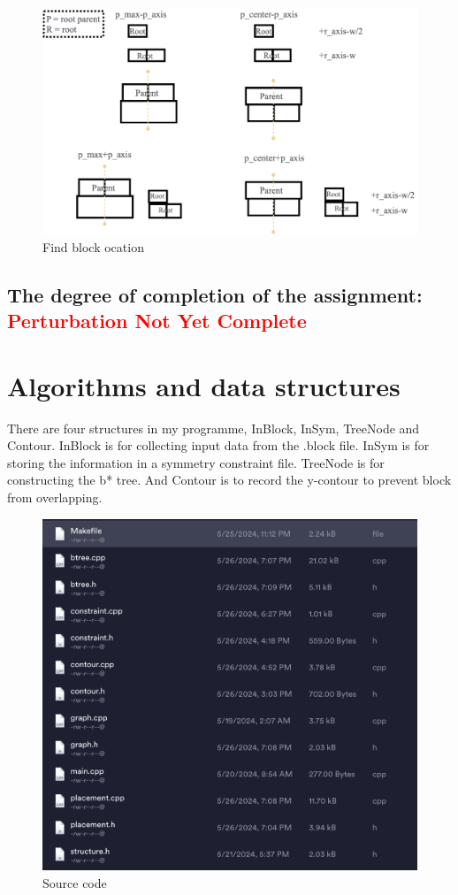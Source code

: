 \documentclass{article}
\begin{document}
  \begin{figure}[H]
    \centering
    \includegraphics[width=0.65\linewidth]{./img/2024-05-26-21-07-40.png}
    \caption{Find block ocation}
\end{figure}


\subsection{The degree of completion of the assignment: \textcolor{red}{Perturbation Not Yet Complete}}

\section{Algorithms and data structures}

There are four structures in my programme, InBlock, InSym, TreeNode and Contour. InBlock is for collecting input data from the .block file. InSym is for storing the information in a symmetry constraint file. TreeNode is for constructing the b* tree. And Contour is to record the y-contour to prevent block from overlapping.




\begin{figure}[H]
    \centering
    \includegraphics[width=0.8\linewidth]{./img/2024-05-26-19-57-06.png}
    \caption{Source code}
    \label{source code}
  \end{figure}
  
\end{document}
